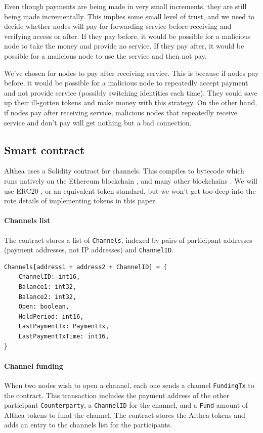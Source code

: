 \documentclass[11pt]{article}
\begin{document}
Even though payments are being made in very small increments, they are still being made incrementally. This implies some small level of trust, and we need to decide whether nodes will pay for forwarding service before receiving and verifying access or after. If they pay before, it would be possible for a malicious node to take the money and provide no service. If they pay after, it would be possible for a malicious node to use the service and then not pay.
 
We’ve chosen for nodes to pay after receiving service. This is because if nodes pay before, it would be possible for a malicious node to repeatedly accept payment and not provide service (possibly switching identities each time). They could save up their ill-gotten tokens and make money with this strategy. On the other hand, if nodes pay after receiving service, malicious nodes that repeatedly receive service and don’t pay will get nothing but a bad connection.

\subsection{Smart contract}
Althea uses a Solidity contract for channels. This compiles to bytecode which runs natively on the Ethereum blockchain \cite{ethereum}, and many other blockchains \cite{ethermint}. We will use ERC20 \cite{erc20}, or an equivalent token standard, but we won’t get too deep into the rote details of implementing tokens in this paper.

\paragraph{Channels list}
The contract stores a list of \texttt{Channels}, indexed by pairs of participant addresses (payment addresses, not IP addresses) and \texttt{ChannelID}.

\begin{minipage}[c]{\textwidth}
\begin{lstlisting}
Channels[address1 + address2 + ChannelID] = {
	ChannelID: int16,
	Balance1: int32,
	Balance2: int32,
	Open: boolean,
	HoldPeriod: int16,
	LastPaymentTx: PaymentTx,
	LastPaymentTxTime: int16,
}
\end{lstlisting}
\end{minipage}

\paragraph{Channel funding}
When two nodes wish to open a channel, each one sends a channel \texttt{FundingTx} to the contract. This transaction includes the payment address of the other participant \texttt{Counterparty}, a \texttt{ChannelID} for the channel, and a \texttt{Fund} amount of Althea tokens to fund the channel. The contract stores the Althea tokens and adds an entry to the channels list for the participants.
\end{document}
